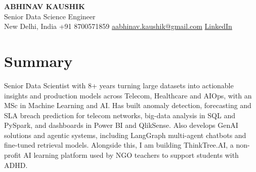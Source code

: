 \documentclass[10pt,a4paper]{article}
\begin{document}
\begin{center}
  {\LARGE\bfseries ABHINAV KAUSHIK}\\[2pt]
  {\large Senior Data Science Engineer}\\[2pt]
  New Delhi, India \textbar{} +91 8700571859 \textbar{} \href{mailto:aabhinav.kaushik@gmail.com}{aabhinav.kaushik@gmail.com} \textbar{} \href{https://www.linkedin.com/in/abhinav-kaushik10/}{LinkedIn}  
\end{center}

\section{Summary}
Senior Data Scientist with 8+ years turning large datasets into actionable insights and production models across Telecom, Healthcare and AIOps, with an MSc in Machine Learning and AI. Has built anomaly detection, forecasting and SLA breach prediction for telecom networks, big-data analysis in SQL and PySpark, and dashboards in Power BI and QlikSense. Also develops GenAI solutions and agentic systems, including LangGraph multi-agent chatbots and fine-tuned retrieval models. Alongside this, I am building ThinkTree.AI, a non-profit AI learning platform used by NGO teachers to support students with ADHD.
\end{document}
